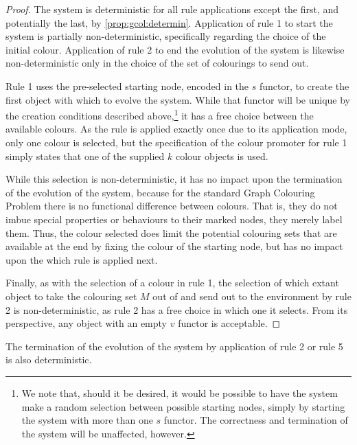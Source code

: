 \begin{proof}
The system is deterministic for all rule applications except the first, and potentially the last, by \autoref{prop:gcol:determin}.  Application of rule 1 to start the system is partially non-deterministic, specifically regarding the choice of the initial colour.  Application of rule 2 to end the evolution of the system is likewise non-deterministic only in the choice of the set of colourings to send out.

Rule 1 uses the pre-selected starting node, encoded in the \(s\) functor, to create the first \bo{} object with which to evolve the system.  While that functor will be unique by the creation conditions described above,\footnote{We note that, should it be desired, it would be possible to have the system make a random selection between possible starting nodes, simply by starting the system with more than one \(s\) functor.  The correctness and termination of the system will be unaffected, however.} it has a free choice between the available colours.  As the rule is applied exactly once due to its application mode, only one colour is selected, but the specification of the colour promoter for rule 1 simply states that one of the supplied \(k\) colour objects is used.

While this selection is non-deterministic, it has no impact upon the termination of the evolution of the system, because for the standard Graph Colouring Problem there is no functional difference between colours.  That is, they do not imbue special properties or behaviours to their marked nodes, they merely label them.  Thus, the colour selected does limit the potential colouring sets that are available at the end by fixing the colour of the starting node, but has no impact upon the which rule is applied next.

Finally, as with the selection of a colour in rule 1, the selection of which extant \bo{} object to take the colouring set \(M\) out of and send out to the environment by rule 2 is non-deterministic, as rule 2 has a free choice in which one it selects.  From its perspective, any \bo{} object with an empty \(v\) functor is acceptable.
\end{proof}

\begin{proposition}\label{prop:gcol:ending}
The termination of the evolution of the system by application of rule 2 or rule 5 is also deterministic.
\end{proposition}

